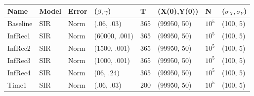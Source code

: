 \documentclass[12pt]{article}
\begin{document}
\begin{table}[]
\centering
\begin{tabular}{@{}llllllll@{}}
\toprule
\textbf{Name} & \textbf{Model} & \textbf{Error} & \textbf{($\beta, \gamma$)} & \textbf{T} & \textbf{(X(0),Y(0))} & \textbf{N} & \textbf{($\sigma_X, \sigma_Y$)} \\ \midrule
  Baseline        & SIR      &   Norm             & (.06, .03)                          &     365       &  (99950, 50)                    &  $10^5$          &(100, 5)                                \\ \midrule
  InfRec1       & SIR      &   Norm             & (60000, .001)                          &     365       &  (99950, 50)                    &  $10^5$          &(100, 5)\\
  InfRec2      & SIR      &   Norm             & (1500, .001)                          &     365       &  (99950, 50)                    &  $10^5$          &(100, 5)                                \\
  InfRec3      & SIR      &   Norm             & (1000, .001)                          &     365       &  (99950, 50)                    &  $10^5$          &(100, 5)                                \\
InfRec4      & SIR      &   Norm             & (06, .24)                          &     365       &  (99950, 50)                    &  $10^5$          &(100, 5)                                \\ \midrule
  Time1 & SIR &  Norm   & (.06, .03)                          &     200       &  (99950, 50)                    &  $10^5$          &(100, 5)                                \\

\end{tabular}
\end{table}
\end{document}
